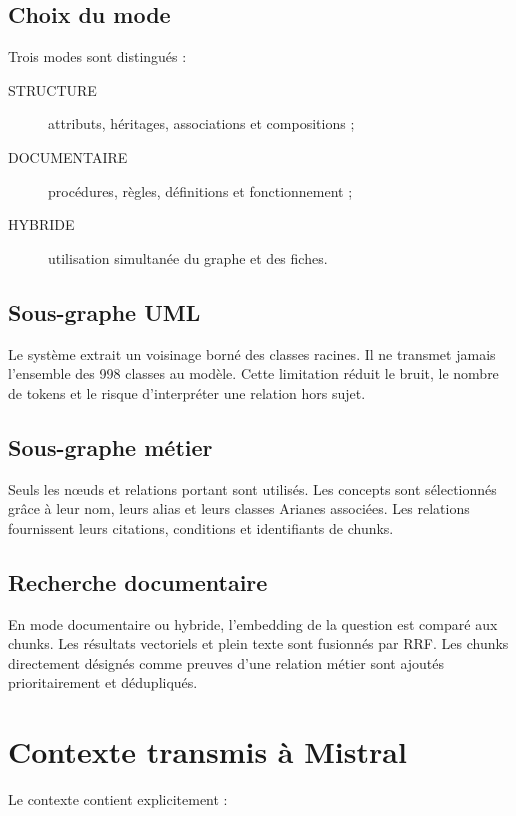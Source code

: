 \subsection{Choix du mode}

Trois modes sont distingués :

\begin{description}
  \item[STRUCTURE] attributs, héritages, associations et compositions ;
  \item[DOCUMENTAIRE] procédures, règles, définitions et fonctionnement ;
  \item[HYBRIDE] utilisation simultanée du graphe et des fiches.
\end{description}

\subsection{Sous-graphe UML}

Le système extrait un voisinage borné des classes racines. Il ne transmet jamais l'ensemble des 998 classes au modèle. Cette limitation réduit le bruit, le nombre de tokens et le risque d'interpréter une relation hors sujet.

\subsection{Sous-graphe métier}

Seuls les nœuds et relations portant  sont utilisés. Les concepts sont sélectionnés grâce à leur nom, leurs alias et leurs classes Arianes associées. Les relations fournissent leurs citations, conditions et identifiants de chunks.

\subsection{Recherche documentaire}

En mode documentaire ou hybride, l'embedding de la question est comparé aux chunks. Les résultats vectoriels et plein texte sont fusionnés par RRF. Les chunks directement désignés comme preuves d'une relation métier sont ajoutés prioritairement et dédupliqués.

\section{Contexte transmis à Mistral}

Le contexte contient explicitement :

